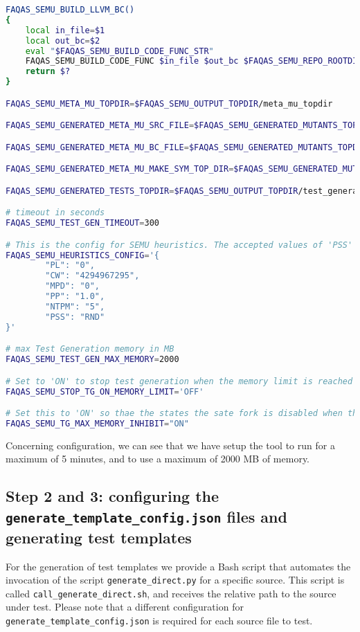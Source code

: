 \begin{lstlisting}[language=bash,label=listing:ESAIL:conf,caption=faqas\_semus\_conf.sh file for ESAIL case study.]
FAQAS_SEMU_BUILD_LLVM_BC()
{
    local in_file=$1
    local out_bc=$2
    eval "$FAQAS_SEMU_BUILD_CODE_FUNC_STR"
    FAQAS_SEMU_BUILD_CODE_FUNC $in_file $out_bc $FAQAS_SEMU_REPO_ROOTDIR clang '-c -emit-llvm'
    return $?
}

FAQAS_SEMU_META_MU_TOPDIR=$FAQAS_SEMU_OUTPUT_TOPDIR/meta_mu_topdir

FAQAS_SEMU_GENERATED_META_MU_SRC_FILE=$FAQAS_SEMU_GENERATED_MUTANTS_TOPDIR/"${ENV_FAQAS_SEMU_SRC_FILE%.c}".MetaMu.c

FAQAS_SEMU_GENERATED_META_MU_BC_FILE=$FAQAS_SEMU_GENERATED_MUTANTS_TOPDIR/"${ENV_FAQAS_SEMU_SRC_FILE%.c}".MetaMu.bc

FAQAS_SEMU_GENERATED_META_MU_MAKE_SYM_TOP_DIR=$FAQAS_SEMU_GENERATED_MUTANTS_TOPDIR/"MakeSym-TestGen-Input"

FAQAS_SEMU_GENERATED_TESTS_TOPDIR=$FAQAS_SEMU_OUTPUT_TOPDIR/test_generation

# timeout in seconds
FAQAS_SEMU_TEST_GEN_TIMEOUT=300

# This is the config for SEMU heuristics. The accepted values of 'PSS' are 'RND' for random and 'MDO' for minimum distance to output
FAQAS_SEMU_HEURISTICS_CONFIG='{
        "PL": "0",
        "CW": "4294967295",
        "MPD": "0",
        "PP": "1.0",
        "NTPM": "5",
        "PSS": "RND"
}'

# max Test Generation memory in MB
FAQAS_SEMU_TEST_GEN_MAX_MEMORY=2000

# Set to 'ON' to stop test generation when the memory limit is reached
FAQAS_SEMU_STOP_TG_ON_MEMORY_LIMIT='OFF'

# Set this to 'ON' so thae the states the sate fork is disabled when the memory limit is reached, to avoid going much over it
FAQAS_SEMU_TG_MAX_MEMORY_INHIBIT="ON"
\end{lstlisting}

Concerning \SEMU configuration, we can see that we have setup the tool to run for a maximum of 5 minutes, and to use a maximum of 2000 MB of memory.

\subsection{Step 2 and 3: configuring the \texttt{generate\_template\_config.json} files and generating test templates}

For the generation of test templates we provide a Bash script that automates the invocation of the script \texttt{generate\_direct.py} for a specific source. This script is called \texttt{call\_generate\_direct.sh}, and receives the relative path to the source under test. 
Please note that a different configuration for \texttt{generate\_template\_config.json} is required for each source file to test.

